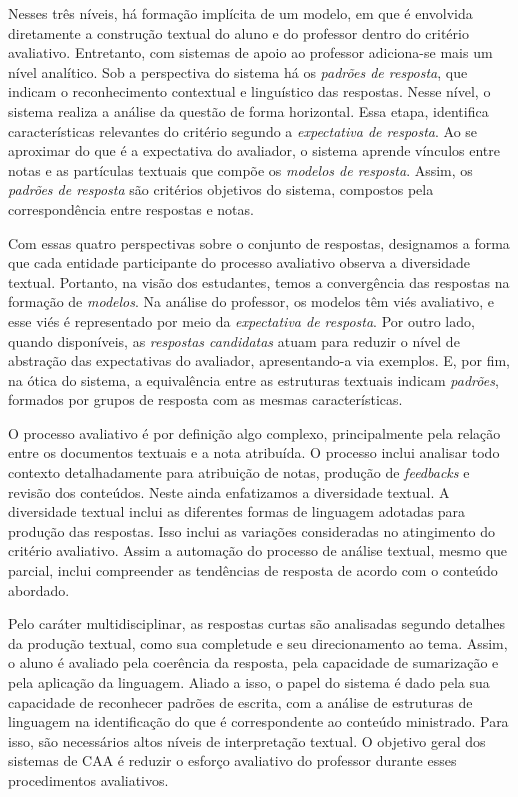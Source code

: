 Nesses três níveis, há formação implícita de um modelo, em que é envolvida diretamente a construção textual do aluno e do professor dentro do critério avaliativo. Entretanto, com sistemas de apoio ao professor adiciona-se mais um nível analítico. Sob a perspectiva do sistema há os \textit{padrões de resposta}, que indicam o reconhecimento contextual e linguístico das respostas. Nesse nível, o sistema realiza a análise da questão de forma horizontal. Essa etapa, identifica características relevantes do critério segundo a \textit{expectativa de resposta}. Ao se aproximar do que é a expectativa do avaliador, o sistema aprende vínculos entre notas e as partículas textuais que compõe os \textit{modelos de resposta}. Assim, os \textit{padrões de resposta} são critérios objetivos do sistema, compostos pela correspondência entre respostas e notas.

Com essas quatro perspectivas sobre o conjunto de respostas, designamos a forma que cada entidade participante do processo avaliativo observa a diversidade textual. Portanto, na visão dos estudantes, temos a convergência das respostas na formação de \textit{modelos}. Na análise do professor, os modelos têm viés avaliativo, e esse viés é representado por meio da \textit{expectativa de resposta}. Por outro lado, quando disponíveis, as \textit{respostas candidatas} atuam para reduzir o nível de abstração das expectativas do avaliador, apresentando-a via exemplos.  E, por fim, na ótica do sistema, a equivalência entre as estruturas textuais indicam \textit{padrões}, formados por grupos de resposta com as mesmas características.

O processo avaliativo é por definição algo complexo, principalmente pela relação entre os documentos textuais e a nota atribuída. O processo inclui analisar todo contexto detalhadamente para atribuição de notas, produção de \textit{feedbacks} e revisão dos conteúdos. Neste ainda enfatizamos a diversidade textual. A diversidade textual inclui as diferentes formas de linguagem adotadas para produção das respostas. Isso inclui as variações consideradas no atingimento do critério avaliativo. Assim a automação do processo de análise textual, mesmo que parcial, inclui compreender as tendências de resposta de acordo com o conteúdo abordado. 

Pelo caráter multidisciplinar, as respostas curtas são analisadas segundo detalhes da produção textual, como sua completude e seu direcionamento ao tema. Assim, o aluno é avaliado pela coerência da resposta, pela capacidade de sumarização e pela aplicação da linguagem. Aliado a isso, o papel do sistema é dado pela sua capacidade de reconhecer padrões de escrita, com a análise de estruturas de linguagem na identificação do que é correspondente ao conteúdo ministrado. Para isso, são necessários altos níveis de interpretação textual. O objetivo geral dos sistemas de CAA é reduzir o esforço avaliativo do professor durante esses procedimentos avaliativos. 

